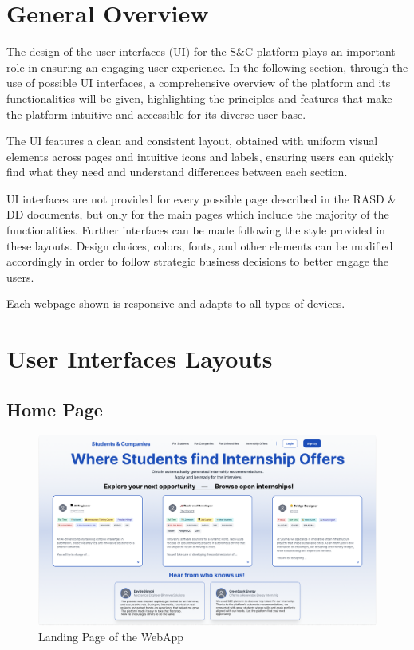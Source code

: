 \section{General Overview}
\label{sec: general_overview}

The design of the user interfaces (UI) for the S\&C platform plays an important role in ensuring an engaging user experience. In the following section, through the use of possible UI interfaces, a comprehensive overview of the platform and its functionalities will be given, highlighting the principles and features that make the platform intuitive and accessible for its diverse user base.

The UI features a clean and consistent layout, obtained with uniform visual elements across pages and intuitive icons and labels, ensuring users can quickly find what they need and understand differences between each section.

UI interfaces are not provided for every possible page described in the RASD \& DD documents, but only for the main pages which include the majority of the functionalities. Further interfaces can be made following the style provided in these layouts. Design choices, colors, fonts, and other elements can be modified accordingly in order to follow strategic business decisions to better engage the users.

Each webpage shown is responsive and adapts to all types of devices.

\newpage

\section{User Interfaces Layouts}
\label{sec: ui_layouts}

\subsection{Home Page}
\label{subsec: home_page}

\begin{figure} [H]
    \begin{center}
        \includegraphics[width=0.9\linewidth]{LaTeXCode/images/UI/Homepage - Student.png}
        \caption{Landing Page of the WebApp}
        \label{fig: homepage}
    \end{center}
\end{figure}

